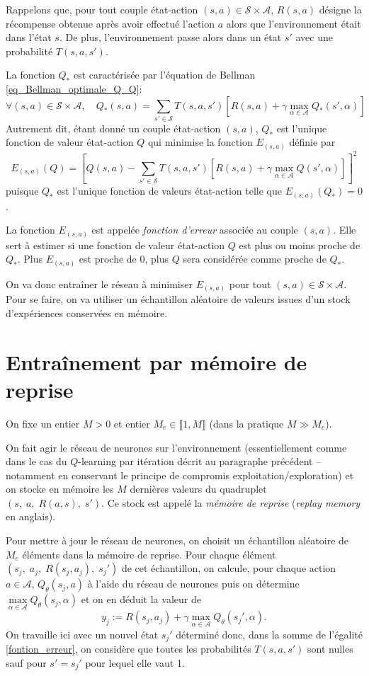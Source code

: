 Rappelons que, pour tout couple état-action $(s,a)\in\mathcal{S}\times\mathcal{A}$, $R(s,a)$ désigne la récompense obtenue après avoir effectué l'action $a$ alors que l'environnement était dans l'état $s$. De plus, l'environnement passe alors dans un état $s'$ avec une probabilité $T(s,a,s')$.  

La fonction $Q_*$ est caractérisée par l'équation de Bellman \eqref{eq_Bellman_optimale_Q_Q}:
$$\forall (s,a)\in\mathcal{S}\times\mathcal{A}, \quad Q_*(s,a) = \sum_{s'\in\mathcal{S}} T(s,a,s') \left[R(s,a) + \gamma \max_{\alpha \in \mathcal{A}} Q_{*}(s',\alpha)\right]$$
Autrement dit, étant donné un couple état-action $(s,a)$, $Q_*$ est l'unique fonction de valeur état-action $Q$ qui minimise la fonction $E_{(s,a)}$ définie par
\begin{equation}
E_{(s,a)}(Q)=\left[Q(s,a)-\sum_{s'\in\mathcal{S}} T(s,a,s') \left[R(s,a) + \gamma \max_{\alpha \in \mathcal{A}} Q(s',\alpha)\right]\right]^2
\label{fontion_erreur}
\end{equation}
puisque $Q_*$ est l'unique fonction de valeurs état-action telle que $E_{(s,a)}(Q_*)=0$.

La fonction $E_{(s,a)}$ est appelée \textit{fonction d'erreur} associée au couple $(s,a)$. Elle sert à estimer si une fonction de valeur état-action $Q$ est plus ou moins proche de $Q_*$. Plus $E_{(s,a)}$ est proche de $0$, plus $Q$ sera considérée comme proche de $Q_*$. 

On va donc entraîner le réseau à minimiser $E_{(s,a)}$ pour tout $(s,a)\in\mathcal{S}\times\mathcal{A}$. Pour se faire, on va utiliser un échantillon aléatoire de valeurs issues d'un stock d'expériences conservées en mémoire.

\section{Entraînement par mémoire de reprise}

On fixe un entier $M>0$ et entier $M_e\in\llbracket 1, M\rrbracket$ (dans la pratique $M\gg M_e$).

On fait agir le réseau de neurones sur l'environnement (essentiellement comme dans le cas du $Q$-learning par itération décrit au paragraphe précédent -- notamment en conservant le principe de compromis exploitation/exploration) et on stocke en mémoire les $M$ dernières valeurs du quadruplet $(s,\; a,\; R(a,s),\; s')$. Ce stock est appelé la \textit{mémoire de reprise} (\textit{replay memory} en anglais).

Pour mettre à jour le réseau de neurones, on choisit un échantillon aléatoire de $M_e$ éléments dans la mémoire de reprise. Pour chaque élément $(s_j,\; a_j,\; R(s_j, a_j),\; s_j')$ de cet échantillon, on calcule, pour chaque action $a\in\mathcal{A}$, $Q_{\theta}(s_j, a)$ à l'aide du réseau de neurones puis on détermine $\mathop{\max}\limits_{\alpha \in\mathcal{A}} Q_{\theta}(s_j,\alpha)$ et on en déduit la valeur de
$$y_j:=R(s_j,a_j)+\gamma \mathop{\max}\limits_{\alpha \in \mathcal{A}} Q_{\theta}(s_j', \alpha).$$
On  travaille ici avec un nouvel état $s_j'$ déterminé donc, dans la somme de l'égalité \eqref{fontion_erreur}, on considère que toutes les probabilités $T(s,a,s')$ sont nulles sauf pour $s'=s_j'$ pour lequel elle vaut 1.

